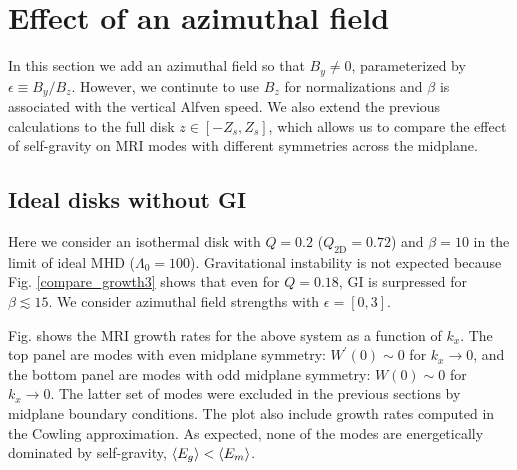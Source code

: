 \section{Effect of an azimuthal field}\label{result3}
In this section we add an azimuthal field so that $B_y\neq 0$,  
parameterized by $\epsilon \equiv B_y/B_z$. However, we continute to
use $B_z$ for normalizations and $\beta$ is associated with the
vertical Alfven speed. We also extend the previous calculations to the
full disk $z\in[-Z_s,Z_s]$, which allows us to compare the effect of
self-gravity on MRI modes with different symmetries across the
midplane. 

\subsection{Ideal disks without GI} 
Here we consider an isothermal disk with $Q=0.2$
($Q_\mathrm{2D}=0.72$) and $\beta=10$ in the limit of ideal MHD
($\Lambda_0=100$). Gravitational instability is not expected because 
Fig. \ref{compare_growth3} shows that even for $Q=0.18$, GI is 
surpressed for $\beta \lesssim 15$. We consider azimuthal field
strengths with $\epsilon=[0,3]$. 

Fig. shows the MRI growth rates for the above system as a function of
$k_x$. The top panel are modes with even midplane symmetry: 
$W^\prime(0)\sim 0$ for $k_x\to0$, and the bottom panel are modes with odd midplane 
symmetry: $W(0)\sim 0$ for $k_x\to0$. The latter set of modes were 
excluded in the previous sections by midplane boundary 
conditions. The plot also include growth rates computed in the Cowling
approximation. As expected, none of the modes are energetically
dominated by self-gravity, $\langle{E_g}\rangle<\langle{E_m}\rangle$. 


